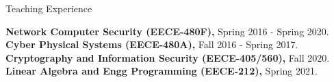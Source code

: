 \begin{rubric}{Teaching Experience}

%
\textbf{Network Computer Security (EECE-480F),} Spring 2016 - Spring 2020.
%
\textbf{Cyber Physical Systems (EECE-480A),} Fall 2016 - Spring 2017.
\entry*[]%
\textbf{Cryptography and Information Security (EECE-405/560),} Fall 2020.
\entry*[]%
\textbf{Linear Algebra and Engg Programming (EECE-212),} Spring 2021.
%
\end{rubric}